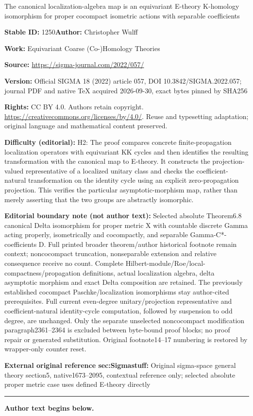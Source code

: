 \documentclass[11pt]{article}
\numberwithin{equation}{section}
\numberwithin{equation}{section}
\theoremstyle{definition}
\begin{document}
\begin{center}\Large The canonical localization-algebra map is an equivariant E-theory K-homology isomorphism for proper cocompact isometric actions with separable coefficients\end{center}
\noindent\textbf{Stable ID:} 1250\quad\textbf{Author:} Christopher Wulff\par
\noindent\textbf{Work:} Equivariant Coarse (Co-)Homology Theories\par
\noindent\textbf{Source:} \url{https://sigma-journal.com/2022/057/}\par
\noindent\textbf{Version:} Official SIGMA 18 (2022) article 057, DOI 10.3842/SIGMA.2022.057; journal PDF and native TeX acquired 2026-09-30, exact bytes pinned by SHA256\par
\noindent\textbf{Rights:} CC BY 4.0. Authors retain copyright. \url{https://creativecommons.org/licenses/by/4.0/}. Reuse and typesetting adaptation; original language and mathematical content preserved.\par
\noindent\textbf{Difficulty (editorial):} {\CJKfont H2: The proof compares concrete finite-propagation localization operators with equivariant KK cycles and then identifies the resulting transformation with the canonical map to E-theory. It constructs the projection-valued representative of a localized unitary class and checks the coefficient-natural transformation on the identity cycle using an explicit zero-propagation projection. This verifies the particular asymptotic-morphism map, rather than merely asserting that the two groups are abstractly isomorphic.}\par
\medskip\noindent\textbf{Editorial boundary note (not author text):} Selected absolute Theorem6.8 canonical Delta isomorphism for proper metric X with countable discrete Gamma acting properly, isometrically and cocompactly, and separable Gamma-C*-coefficients D. Full printed broader theorem/author historical footnote remain context; noncocompact truncation, nonseparable extension and relative consequence receive no count. Complete Hilbert-module/Roe/local-compactness/propagation definitions, actual localization algebra, delta asymptotic morphism and exact Delta composition are retained. The previously established cocompact Paschke/localization isomorphisms stay author-cited prerequisites. Full current even-degree unitary/projection representative and coefficient-natural identity-cycle computation, followed by suspension to odd degree, are unchanged. Only the separate unselected noncocompact modification paragraph2361–2364 is excluded between byte-bound proof blocks; no proof repair or generated substitution. Original footnote14–17 numbering is restored by wrapper-only counter reset.\par
\noindent\textbf{External original reference sec:Sigmastuff:} Original sigma-space general theory section5, native1673–2095, contextual reference only; selected absolute proper metric case uses defined E-theory directly\par
\medskip\hrule\medskip\noindent\textbf{Author text begins below.}\par
\setcounter{section}{4}\setcounter{subsection}{3}
\end{document}
